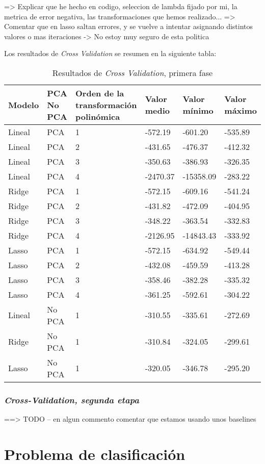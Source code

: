 \documentclass[11pt]{article}
\begin{document}
=> Explicar que he hecho en codigo, seleccion de lambda fijado por mi, la metrica de error negativa, las transformaciones que hemos realizado...
=> Comentar que en lasso saltan errores, y se vuelve a intentar asignando distintos valores o mas iteraciones -> No estoy muy seguro de esta politica

Los resultados de \emph{Cross Validation} se resumen en la siguiente tabla:

\begin{table}[H]
\begin{tabularx}{\textwidth}{|X|X|X|X|X|X|}
    \hline
    \textbf{Modelo} & \textbf{PCA \/ No PCA}& \textbf{Orden de la transformación polinómica} & \textbf{Valor medio} & \textbf{Valor mínimo} & \textbf{Valor máximo} \\
    \hline
    Lineal & PCA & 1 & -572.19 & -601.20 & -535.89 \\
    Lineal & PCA & 2 & -431.65 &-476.37 & -412.32 \\
    Lineal & PCA & 3 &-350.63 &-386.93 & -326.35 \\
    Lineal & PCA & 4 & -2470.37 &-15358.09 & -283.22 \\
    Ridge  & PCA & 1 &-572.15 &-609.16 & -541.24 \\
    Ridge  & PCA & 2 & -431.82 &-472.09 & -404.95 \\
    Ridge  & PCA & 3 & -348.22 &-363.54 & -332.83 \\
    Ridge  & PCA & 4 & -2126.95 &-14843.43 & -333.92 \\
    Lasso  & PCA & 1 & -572.15 &-634.92 & -549.44 \\
    Lasso  & PCA & 2 & -432.08 &-459.59 & -413.28 \\
    Lasso  & PCA & 3 & -358.46 &-382.28 & -335.32 \\
    Lasso  & PCA & 4 & -361.25 &-592.61 & -304.22 \\
    Lineal & No PCA & 1 & -310.55 &-335.61 & -272.69 \\
    Ridge  & No PCA & 1 &-310.84 &-324.05 & -299.61 \\
    Lasso  & No PCA & 1 & -320.05 &-346.78 & -295.20 \\
    \hline
\end{tabularx}
    \caption{Resultados de \emph{Cross Validation}, primera fase}
\end{table}














\subsubsection{\emph{Cross-Validation, segunda etapa}}



==> TODO -- en algun commento comentar que estamos usando unos baselines
\pagebreak
\section{Problema de clasificación}

\pagebreak



\end{document}
